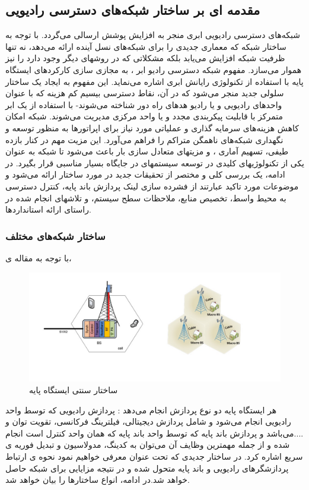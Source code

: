 \subsection{مقدمه ای بر ساختار شبکه‌های دسترسی رادیویی }
شبکه‌های دسترسی رادیویی‌ ابری منجر به افزایش پوشش ارسالی می‌گردد. با توجه به ساختار شبکه
    که معماری جدیدی را برای شبکه‌های نسل آینده
ارائه می‌دهد، نه تنها ظرفیت شبکه افزایش می‌یابد بلکه
مشکلاتی که در روشهای دیگر وجود دارد را نیز هموار
می‌سازد.
مفهوم شبکه دسترسی رادیو ابر ، به مجازی سازی کارکردهای ایستگاه  پایه  با استفاده از تکنولوژی رایانش ابری  اشاره می‌نماید. این مفهوم به ایجاد یک ساختار سلولی جدید منجر می‌شود که در آن، نقاط دسترسی بیسیم کم هزینه که با عنوان واحدهای رادیویی  و یا رادیو هدهای
  راه دور 
 شناخته می‌شوند- با استفاده از یک ابر متمرکز با قابلیت پیکربندی مجدد و یا واحد مرکزی  مدیریت می‌شوند. شبکه امکان کاهش هزینه‌های سرمایه گذاری و عملیاتی مورد نیاز برای اپراتورها به منظور توسعه و نگهداری شبکه‌های ناهمگن متراکم را فراهم می‌آورد. این مزیت مهم در کنار بازده طیفی، تسهیم آماری ، و مزیتهای متعادل سازی بار باعث می‌شود تا شبکه  به عنوان یکی از تکنولوژیهای کلیدی در توسعه سیستمهای  در جایگاه بسیار مناسبی قرار بگیرد. در ادامه، یک بررسی کلی و مختصر از تحقیقات جدید در مورد ساختار  ارائه می‌شود و موضوعات مورد تاکید عبارتند از فشرده سازی لینک  پردازش باند پایه، کنترل دسترسی به محیط واسط، تخصیص منابع، ملاحظات سطح سیستم، و تلاشهای انجام شده در راستای ارائه استانداردها.
\subsubsection{ساختار شبکه‌های مختلف }
با توجه به مقاله ی\cite{checko2015cloud}،
\begin{figure}
  \centering
    \includegraphics[scale=0.7]{./fig/c11}
  \caption{ساختار سنتی ایستگاه پایه \cite{checko2015cloud}}
  \label{fig:c11}
\end{figure}
هر ایستگاه پایه دو نوع پردازش انجام می‌دهد : پردازش
رادیویی که توسط واحد رادیویی  انجام می‌شود و شامل پردازش
دیجیتالی، فیلترینگ فرکانسی، تقویت توان و ....می‌باشد و
پردازش باند پایه که توسط واحد باند پایه  که همان واحد کنترل است  انجام شده و از جمله
مهمترین وظایف آن می‌توان به کدینگ، مدولاسیون و
تبدیل فوریه ی سریع اشاره کرد. در ساختار جدیدی که
تحت عنوان   معرفی خواهیم نمود نحوه ی ارتباط
پردازشگرهای رادیویی و باند پایه متحول شده و در نتیجه
مزایایی برای شبکه حاصل خواهد شد.در ادامه، انواع ساختارها را بیان خواهد شد.

